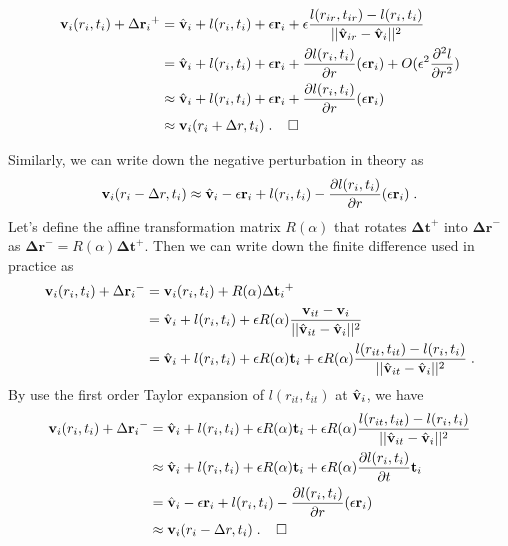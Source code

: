 \begin{align*}
    {\mathbf{v}_i}({r_i},{t_i}) + \Delta {\mathbf{r}_i}^ +  
    &= \hat{\mathbf{v}}_i + l({r_i},{t_i}) + \epsilon \mathbf{r}_i + \epsilon {{l({r_{ir}},{t_{ir}}) - l({r_i},{t_i})} \over {||{\hat{\mathbf{v}}_{ir}} - {\hat{\mathbf{v}}_i}||^2}} \\
    &= \hat{\mathbf{v}}_i + l({r_i},{t_i}) + \epsilon \mathbf{r}_i + {{\partial l({r_i},{t_i})} \over {\partial r}}(\epsilon {\mathbf{r}_i}) + O(\epsilon^2 {{{\partial ^2}l} \over {\partial {r^2}}}) \\
    &\approx \hat{\mathbf{v}}_i + l({r_i},{t_i}) + \epsilon \mathbf{r}_i + {{\partial l({r_i},{t_i})} \over {\partial r}}(\epsilon {\mathbf{r}_i}) \\
    &\approx {\mathbf{v}_i}({r_i} + \Delta r,{t_i}) \;. 
    \;\;\;\;\square
\end{align*}

Similarly, we can write down the negative perturbation in theory as 
\begin{equation*}
    {\mathbf{v}_i}({r_i} - \Delta r,{t_i}) \approx \hat{\mathbf{v}}_i - \epsilon {\mathbf{r}_i} + l({r_i},{t_i}) - {{\partial l({r_i},{t_i})} \over {\partial r}}(\epsilon {\mathbf{r}_i})\;.
\end{equation*}
Let's define the affine transformation matrix $R(\alpha)$ that rotates $\mathbf{\Delta t}^+$ into $\mathbf{\Delta r}^-$ as $\mathbf{\Delta r}^- = R(\alpha)\mathbf{\Delta t}^+$.
Then we can write down the finite difference used in practice as
\begin{align*}
    {\mathbf{v}_i}({r_i},{t_i}) + \Delta {\mathbf{r}_i}^ -  
    &= {\mathbf{v}_i}({r_i},{t_i}) + R(\alpha )\Delta {\mathbf{t}_i}^ + \\
    &= \hat{\mathbf{v}}_i + l({r_i},{t_i}) + \epsilon R(\alpha ){{{\mathbf{v}_{it}} - {\mathbf{v}_i}} \over {||{\hat{\mathbf{v}}_{it}} - {\hat{\mathbf{v}}_i}|{|^2}}} \\
    &= \hat{\mathbf{v}}_i + l({r_i},{t_i}) + \epsilon R(\alpha ){\mathbf{t}_i} + \epsilon R(\alpha ) {{l({r_{it}},{t_{it}}) - l({r_i},{t_i})} \over {||{\hat{\mathbf{v}}_{it}} - {\hat{\mathbf{v}}_i}||^2}}\;.
\end{align*}
By use the first order Taylor expansion of $l({r_{it}},{t_{it}})$ at $\hat{\mathbf{v}}_i$, we have
\begin{align*}
    {\mathbf{v}_i}({r_i},{t_i}) + \Delta {\mathbf{r}_i}^ -  
    &= \hat{\mathbf{v}}_i + l({r_i},{t_i}) + \epsilon R(\alpha ){\mathbf{t}_i} + \epsilon R(\alpha ) {{l({r_{it}},{t_{it}}) - l({r_i},{t_i})} \over {||{\hat{\mathbf{v}}_{it}} - {\hat{\mathbf{v}}_i}||^2}} \\
    &\approx \hat{\mathbf{v}}_i + l({r_i},{t_i}) + \epsilon R(\alpha ){\mathbf{t}_i} + \epsilon R(\alpha ) {{\partial l({r_i},{t_i})} \over {\partial t}}{\mathbf{t}_i} \\
    &= \hat{\mathbf{v}}_i - \epsilon {\mathbf{r}_i} + l({r_i},{t_i}) - {{\partial l({r_i},{t_i})} \over {\partial r}}(\epsilon {\mathbf{r}_i}) \\
    &\approx {\mathbf{v}_i}({r_i} - \Delta r,{t_i}) \;.
    \;\;\;\;\square
\end{align*}

